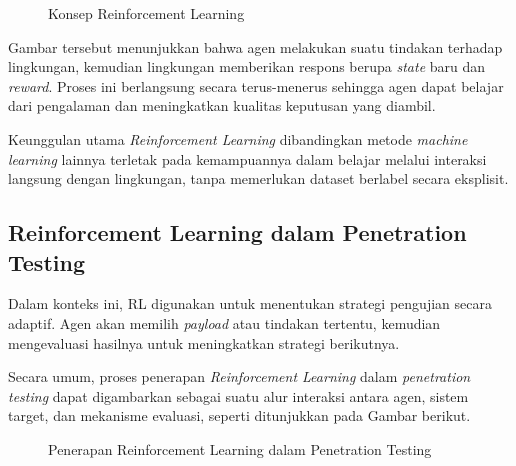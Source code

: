 \begin{figure}[H]
\centering
{}
\caption{Konsep Reinforcement Learning}
\end{figure}

Gambar tersebut menunjukkan bahwa agen melakukan suatu tindakan terhadap lingkungan, kemudian lingkungan memberikan respons berupa \textit{state} baru dan \textit{reward}. Proses ini berlangsung secara terus-menerus sehingga agen dapat belajar dari pengalaman dan meningkatkan kualitas keputusan yang diambil.

Keunggulan utama \textit{Reinforcement Learning} dibandingkan metode \textit{machine learning} lainnya terletak pada kemampuannya dalam belajar melalui interaksi langsung dengan lingkungan, tanpa memerlukan dataset berlabel secara eksplisit.

\subsection{Reinforcement Learning dalam Penetration Testing}
Dalam konteks ini, RL digunakan untuk menentukan strategi pengujian secara adaptif. Agen akan memilih \textit{payload} atau tindakan tertentu, kemudian mengevaluasi hasilnya untuk meningkatkan strategi berikutnya.

Secara umum, proses penerapan \textit{Reinforcement Learning} dalam \textit{penetration testing} dapat digambarkan sebagai suatu alur interaksi antara agen, sistem target, dan mekanisme evaluasi, seperti ditunjukkan pada Gambar berikut.

\begin{figure}[H]
\centering
{}
\caption{Penerapan Reinforcement Learning dalam Penetration Testing}
\end{figure}

